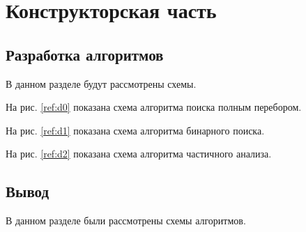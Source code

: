 \chapter{Конструкторская часть}
\label{cha:design}

\section{Разработка алгоритмов}

В данном разделе будут рассмотрены схемы.

На рис. \ref{ref:d0} показана схема алгоритма поиска полным перебором.

\begin{figure}[ht!]
\end{figure}

На рис. \ref{ref:d1} показана схема алгоритма бинарного поиска.

\begin{figure}[ht!]
\end{figure}

На рис. \ref{ref:d2} показана схема алгоритма частичного анализа.

\begin{figure}[ht!]
\end{figure}

\section{Вывод}

В данном разделе были рассмотрены схемы алгоритмов.






